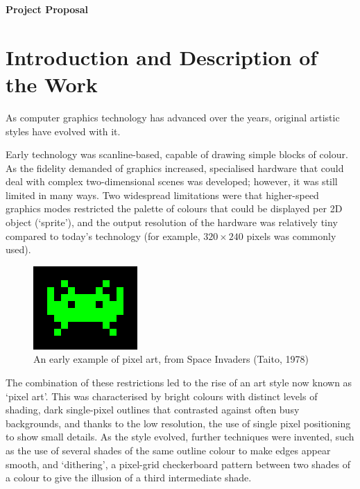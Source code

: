 \documentclass[12pt,twoside,notitlepage]{report}
\begin{document}
\pagestyle{empty}

\vspace*{60mm}
\begin{center}
\Huge
{\bf Project Proposal}
\end{center}

\cleardoublepage

\section*{Introduction and Description of the Work}

As computer graphics technology has advanced over the years, original artistic styles have evolved with it.

Early technology was scanline-based, capable of drawing simple blocks of colour. As the fidelity demanded of graphics increased, specialised hardware that could deal with complex two-dimensional scenes was developed; however, it was still limited in many ways. Two widespread limitations were that higher-speed graphics modes restricted the palette of colours that could be displayed per 2D object (`sprite'), and the output resolution of the hardware was relatively tiny compared to today's technology (for example, $320\times240$ pixels was commonly used).

\begin{figure}[h!]
\centering
\includegraphics{spaceinvadersprite}
\caption{An early example of pixel art, from Space Invaders (Taito, 1978)}
\end{figure}

The combination of these restrictions led to the rise of an art style now known as `pixel art'. This was characterised by bright colours with distinct levels of shading, dark single-pixel outlines that contrasted against often busy backgrounds, and thanks to the low resolution, the use of single pixel positioning to show small details. As the style evolved, further techniques were invented, such as the use of several shades of the same outline colour to make edges appear smooth, and `dithering', a pixel-grid checkerboard pattern between two shades of a colour to give the illusion of a third intermediate shade.
\end{document}
